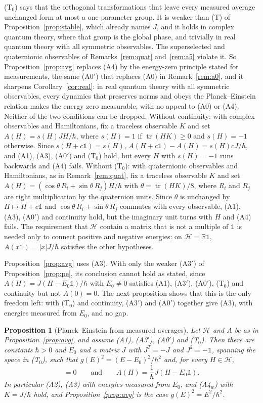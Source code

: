 \documentclass[11pt]{article}
\newtheorem{proposition}[theorem]{Proposition}
\theoremstyle{remark}
\newcommand{\R}{\mathbb{R}}
\newcommand{\one}{\mathbb{1}}
\newcommand{\tr}{\operatorname{tr}}
\begin{document}
(T$_0$) says that the orthogonal transformations that leave every measured average unchanged form at most a one-parameter group. It is weaker than (T) of Proposition~\ref{prop:stable}, which already names $J$, and it holds in complex quantum theory, where that group is the global phase, and trivially in real quantum theory with all symmetric observables. The superselected and quaternionic observables of Remarks~\ref{rem:quat} and~\ref{rem:a5} violate it. So Proposition~\ref{prop:avg} replaces (A4) by the energy-zero principle stated for measurements, the same (A0$'$) that replaces (A0) in Remark~\ref{rem:a0}, and it sharpens Corollary~\ref{cor:real}: in real quantum theory with all symmetric observables, every dynamics that preserves norms and obeys the Planck--Einstein relation makes the energy zero measurable, with no appeal to (A0) or (A4). Neither of the two conditions can be dropped. Without continuity: with complex observables and Hamiltonians, fix a traceless observable $K$ and set $A(H)=s(H)JH/\hbar$, where $s(H)=1$ if $\tr(HK)\ge0$ and $s(H)=-1$ otherwise. Since $s(H+c\one)=s(H)$, $A(H+c\one)-A(H)=s(H)cJ/\hbar$, and (A1), (A3), (A0$'$) and (T$_0$) hold, but every $H$ with $s(H)=-1$ runs backwards and (A4) fails. Without (T$_0$): with quaternionic observables and Hamiltonians, as in Remark~\ref{rem:quat}, fix a traceless observable $K$ and set $A(H)=(\cos\theta\,R_i+\sin\theta\,R_j)H/\hbar$ with $\theta=\tr(HK)/8$, where $R_i$ and $R_j$ are right multiplication by the quaternion units. Since $\theta$ is unchanged by $H\mapsto H+c\one$ and $\cos\theta\,R_i+\sin\theta\,R_j$ commutes with every observable, (A1), (A3), (A0$'$) and continuity hold, but the imaginary unit turns with $H$ and (A4) fails. The requirement that $\mathcal{H}$ contain a matrix that is not a multiple of $\one$ is needed only to connect positive and negative energies: on $\mathcal{H}=\R\one$, $A(x\one)=|x|J/\hbar$ satisfies the other hypotheses.

Proposition~\ref{prop:avg} uses (A3). With only the weaker (A3$'$) of Proposition~\ref{prop:pe}, its conclusion cannot hold as stated, since $A(H)=J(H-E_0\one)/\hbar$ with $E_0\neq0$ satisfies (A1), (A3$'$), (A0$'$), (T$_0$) and continuity but not $A(0)=0$. The next proposition shows that this is the only freedom left: with (T$_0$) and continuity, (A3$'$) and (A0$'$) together give (A3), with energies measured from $E_0$, and no gap.

\begin{proposition}[Planck--Einstein from measured averages]\label{prop:avgpe}
Let $\mathcal{H}$ and $A$ be as in Proposition~\ref{prop:avg}, and assume (A1), (A3$'$), (A0$'$) and (T$_0$). Then there are constants $\hbar>0$ and $E_0$ and a matrix $J$ with $J^T=-J$ and $J^2=-\one$, spanning the space in (T$_0$), such that $g(E)^2=(E-E_0)^2/\hbar^2$ and, for every $H\in\mathcal{H}$,
\begin{equation}
[J,H]=0\qquad\text{and}\qquad A(H)=\frac{1}{\hbar}J(H-E_0\one).
\end{equation}
In particular (A2), (A3) with energies measured from $E_0$, and (A4$_w$) with $K=J/\hbar$ hold, and Proposition~\ref{prop:avg} is the case $g(E)^2=E^2/\hbar^2$.
\end{proposition}
\end{document}
